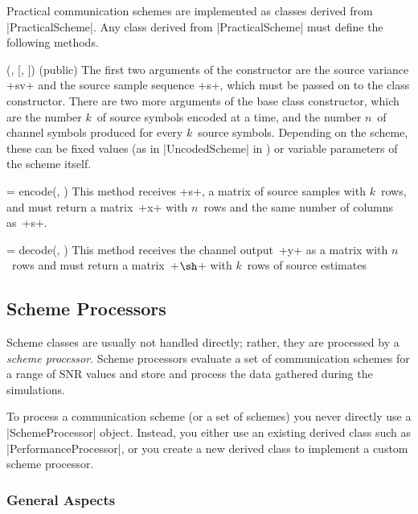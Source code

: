 Practical communication schemes are implemented as classes derived from
|PracticalScheme|. Any class derived from |PracticalScheme| must define the
following methods.
\begin{method}{(,  [, ])
  (public)}
  The first two arguments of the constructor are the source variance +sv+ and
  the source sample sequence +s+, which must be passed on to the class
  constructor. There are two more arguments of the base class constructor, which
  are the number $k$~of source symbols encoded at a time, and the number $n$~of
  channel symbols produced for every $k$~source symbols. Depending on the
  scheme, these can be fixed values (as in |UncodedScheme| in )
  or variable parameters of the scheme itself.
\end{method}

\begin{method}{ = encode(\obj, )}
  This method receives +s+, a matrix of source samples with $k$~rows, and must
  return a matrix~+x+ with $n$~rows and the same number of columns as~+s+.
\end{method}

\begin{method}{\oarg{$\sh$} = decode(\obj, )}
  This method receives the channel output~+y+ as a matrix with $n$~rows and
  must return a matrix~+$\sh$+ with $k$~rows of source estimates
\end{method}


\subsection{Scheme Processors}

Scheme classes are usually not handled directly; rather, they are processed by
a \emph{scheme processor}. Scheme processors evaluate a set of communication
schemes for a range of SNR values and store and process the data gathered during
the simulations.

To process a communication scheme (or a set of schemes) you never directly use a
|SchemeProcessor| object. Instead, you either use an existing derived class such
as |PerformanceProcessor|, or you create a new derived class to implement a
custom scheme processor. 


\subsubsection{General Aspects}

